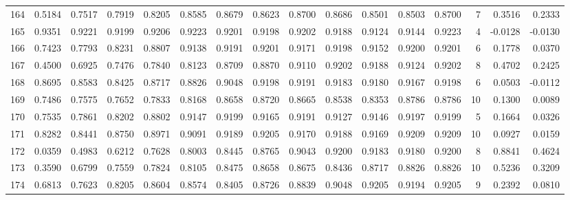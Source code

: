 \begin{tabular}{lrrrrrrrrrrrrrrr}
164 &      0.5184 &  0.7517 &  0.7919 &  0.8205 &  0.8585 &  0.8679 &  0.8623 &  0.8700 &  0.8686 &  0.8501 &   0.8503 &     0.8700 &      7 &                    0.3516 &                     0.2333 \\
165 &      0.9351 &  0.9221 &  0.9199 &  0.9206 &  0.9223 &  0.9201 &  0.9198 &  0.9202 &  0.9188 &  0.9124 &   0.9144 &     0.9223 &      4 &                   -0.0128 &                    -0.0130 \\
166 &      0.7423 &  0.7793 &  0.8231 &  0.8807 &  0.9138 &  0.9191 &  0.9201 &  0.9171 &  0.9198 &  0.9152 &   0.9200 &     0.9201 &      6 &                    0.1778 &                     0.0370 \\
167 &      0.4500 &  0.6925 &  0.7476 &  0.7840 &  0.8123 &  0.8709 &  0.8870 &  0.9110 &  0.9202 &  0.9188 &   0.9124 &     0.9202 &      8 &                    0.4702 &                     0.2425 \\
168 &      0.8695 &  0.8583 &  0.8425 &  0.8717 &  0.8826 &  0.9048 &  0.9198 &  0.9191 &  0.9183 &  0.9180 &   0.9167 &     0.9198 &      6 &                    0.0503 &                    -0.0112 \\
169 &      0.7486 &  0.7575 &  0.7652 &  0.7833 &  0.8168 &  0.8658 &  0.8720 &  0.8665 &  0.8538 &  0.8353 &   0.8786 &     0.8786 &     10 &                    0.1300 &                     0.0089 \\
170 &      0.7535 &  0.7861 &  0.8202 &  0.8802 &  0.9147 &  0.9199 &  0.9165 &  0.9191 &  0.9127 &  0.9146 &   0.9197 &     0.9199 &      5 &                    0.1664 &                     0.0326 \\
171 &      0.8282 &  0.8441 &  0.8750 &  0.8971 &  0.9091 &  0.9189 &  0.9205 &  0.9170 &  0.9188 &  0.9169 &   0.9209 &     0.9209 &     10 &                    0.0927 &                     0.0159 \\
172 &      0.0359 &  0.4983 &  0.6212 &  0.7628 &  0.8003 &  0.8445 &  0.8765 &  0.9043 &  0.9200 &  0.9183 &   0.9180 &     0.9200 &      8 &                    0.8841 &                     0.4624 \\
173 &      0.3590 &  0.6799 &  0.7559 &  0.7824 &  0.8105 &  0.8475 &  0.8658 &  0.8675 &  0.8436 &  0.8717 &   0.8826 &     0.8826 &     10 &                    0.5236 &                     0.3209 \\
174 &      0.6813 &  0.7623 &  0.8205 &  0.8604 &  0.8574 &  0.8405 &  0.8726 &  0.8839 &  0.9048 &  0.9205 &   0.9194 &     0.9205 &      9 &                    0.2392 &                     0.0810 \\

\end{tabular}
